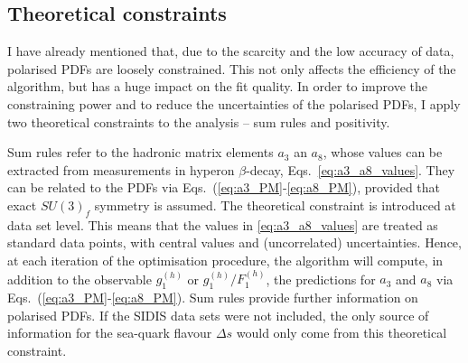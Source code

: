 \subsection*{Theoretical constraints}
I have already mentioned that, due to the scarcity and the low accuracy of data, polarised PDFs are loosely constrained. This not only affects the efficiency of the algorithm, but has a huge impact on the fit quality. In order to improve the constraining power and to reduce the uncertainties of the polarised PDFs, I apply two theoretical constraints to the analysis -- sum rules and positivity.%

Sum rules refer to the hadronic matrix elements $a_3$ an $a_8$, whose values can be extracted from measurements in hyperon $\beta$-decay, Eqs.~\eqref{eq:a3_a8_values}. They can be related to the PDFs via Eqs.~(\ref{eq:a3_PM}-\ref{eq:a8_PM}), provided that exact $SU(3)_f$ symmetry is assumed. The theoretical constraint is introduced at data set level. This means that the values in \eqref{eq:a3_a8_values} are treated as standard data points, with central values and (uncorrelated) uncertainties. Hence, at each iteration of the optimisation procedure, the algorithm will compute, in addition to the observable $g_1^{(h)}$ or $g_1^{(h)}/F_1^{(h)}$, the predictions for $a_3$ and $a_8$ via Eqs.~(\ref{eq:a3_PM}-\ref{eq:a8_PM}). Sum rules provide further information on polarised PDFs. If the SIDIS data sets were not included, the only source of information for the sea-quark flavour $\Delta s$ would only come from this theoretical constraint.%

